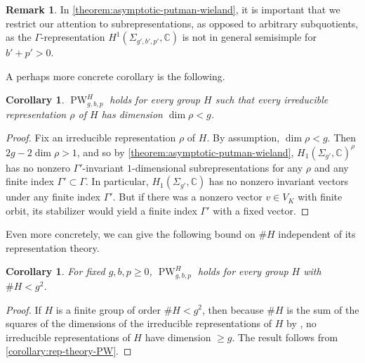\documentclass[12 pt]{amsart}
\theoremstyle{plain}
\newtheorem{corollary}[subsubsection]{Corollary}
\theoremstyle{definition}
\newtheorem{remark}[subsubsection]{Remark}
\theoremstyle{remark}
\numberwithin{equation}{section}
\DeclareMathOperator\PW{PW}
\begin{document}
\begin{remark}
In \autoref{theorem:asymptotic-putman-wieland}, it is important that we restrict our attention to subrepresentations, as opposed to arbitrary subquotients, as the $\Gamma$-representation 	$H^1(\Sigma_{g',b',p'},\mathbb C)$ is not in general semisimple for $b'+p'>0$.
\end{remark}

A perhaps more concrete corollary is the following.
\begin{corollary}
	\label{corollary:rep-theory-PW}
	$\PW_{g,b,p}^H$ holds for every group $H$ 
	such that every irreducible representation $\rho$ of $H$ has dimension
	$\dim \rho < g$.
\end{corollary}
\begin{proof}
	Fix an irreducible representation $\rho$ of $H$. By assumption, $\dim \rho < g$. Then
	$2g - 2\dim \rho > 1$, and so by
	\autoref{theorem:asymptotic-putman-wieland},
	$H_1(\Sigma_{g'},\mathbb C)^\rho$ has no nonzero $\Gamma'$-invariant $1$-dimensional subrepresentations for any $\rho$ and any finite index $\Gamma'\subset\Gamma$.
	In particular, $H_1(\Sigma_{g'},\mathbb C)$ has no nonzero invariant
	vectors under any finite index $\Gamma'$. But if there was a nonzero vector $v\in V_K$ with finite orbit, its stabilizer would yield a finite index $\Gamma'$ with a fixed vector.
\end{proof}
Even more concretely, we can give the following bound on $\#H$ independent of its
representation theory.
\begin{corollary}
	\label{corollary:asymptotic-putman-wieland}
	For fixed $g, b, p \geq 0$,
	$\PW_{g,b,p}^H$ holds for every group $H$ with $\# H < g^2$.
\end{corollary}
\begin{proof}
	If $H$ is a finite group of order $\# H < g^2$, then because $\#
	H$ is the sum of the squares of the dimensions of the irreducible representations of
	$H$ by \cite[(2.19)]{fultonH:representation-theory},
	no irreducible representations of $H$ have
	dimension $\geq g$. The result follows
	from \autoref{corollary:rep-theory-PW}.
\end{proof}
\end{document}
